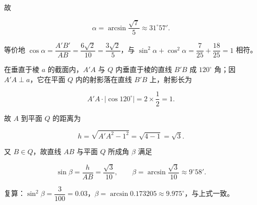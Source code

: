 \begin{answer}
故

\nopagebreak[4]
\[
\alpha=\arcsin\frac{\sqrt7}{5}\approx31^\circ57'.
\]

等价地 $\cos\alpha=\dfrac{A'B'}{AB}=\dfrac{6\sqrt2}{10}=\dfrac{3\sqrt2}{5}$，与 $\sin^2\alpha+\cos^2\alpha=\dfrac7{25}+\dfrac{18}{25}=1$ 相符。


在垂直于棱 $a$ 的截面内，$A'A$ 与 $Q$ 内垂直于棱的直线 $B'B$ 成 $120^\circ$ 角；因 $A'A\perp a$，它在平面 $Q$ 内的射影落在直线 $B'B$ 上，射影长为

\nopagebreak[4]
\[
A'A\cdot\lvert\cos120^\circ\rvert=2\times\frac12=1.
\]

故 $A$ 到平面 $Q$ 的距离为

\nopagebreak[4]
\[
h=\sqrt{A'A^2-1^2}=\sqrt{4-1}=\sqrt3.
\]

又 $B\in Q$，故直线 $AB$ 与平面 $Q$ 所成角 $\beta$ 满足

\nopagebreak[4]
\[
\sin\beta=\frac{h}{AB}=\frac{\sqrt3}{10},
\qquad
\beta=\arcsin\frac{\sqrt3}{10}\approx9^\circ58'.
\]

复算：$\sin^2\beta=\dfrac{3}{100}=0.03$，$\beta=\arcsin0.173205\approx9.975^\circ$，与上式一致。



\end{answer}

